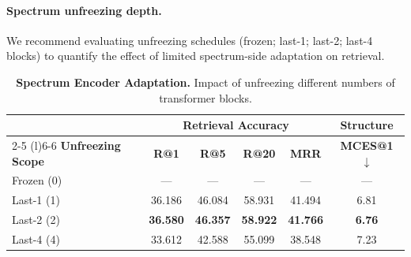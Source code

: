 \paragraph{Spectrum unfreezing depth.}
We recommend evaluating unfreezing schedules (frozen; last-1; last-2; last-4 blocks) to quantify the effect of limited spectrum-side adaptation on retrieval.
\begin{table}[h]
\centering
\caption{\textbf{Spectrum Encoder Adaptation.} Impact of unfreezing different numbers of transformer blocks.}
\label{tab:unfreezing_depth}
\small
\setlength{\tabcolsep}{6pt}
\begin{tabular}{lccccc}
\toprule
& \multicolumn{4}{c}{\textbf{Retrieval Accuracy}} & \textbf{Structure} \\
\cmidrule(lr){2-5} \cmidrule(l){6-6}
\textbf{Unfreezing Scope} & \textbf{R@1} & \textbf{R@5} & \textbf{R@20} & \textbf{MRR} & \textbf{MCES@1} $\downarrow$ \\
\midrule
Frozen (0) & --- & --- & --- & --- & --- \\
Last-1 (1) & 36.186 & 46.084 & 58.931 & 41.494 & 6.81 \\
Last-2 (2) & \textbf{36.580} & \textbf{46.357} & \textbf{58.922} & \textbf{41.766} & \textbf{6.76} \\
Last-4 (4) & 33.612 & 42.588 & 55.099 & 38.548 & 7.23 \\
\bottomrule
\end{tabular}
\end{table}
